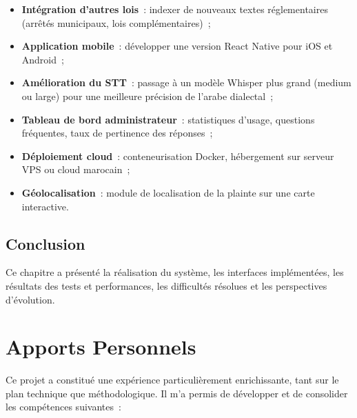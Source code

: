 \documentclass[12pt,a4paper]{report}
\begin{document}
\begin{itemize}[label=\textbullet]
    \item \textbf{Intégration d'autres lois}~: indexer de nouveaux textes réglementaires (arrêtés municipaux, lois complémentaires)~;
    \item \textbf{Application mobile}~: développer une version React Native pour iOS et Android~;
    \item \textbf{Amélioration du STT}~: passage à un modèle Whisper plus grand (medium ou large) pour une meilleure précision de l'arabe dialectal~;
    \item \textbf{Tableau de bord administrateur}~: statistiques d'usage, questions fréquentes, taux de pertinence des réponses~;
    \item \textbf{Déploiement cloud}~: conteneurisation Docker, hébergement sur serveur VPS ou cloud marocain~;
    \item \textbf{Géolocalisation}~: module de localisation de la plainte sur une carte interactive.
\end{itemize}

\section{Conclusion}

Ce chapitre a présenté la réalisation du système, les interfaces implémentées, les résultats des tests et performances, les difficultés résolues et les perspectives d'évolution.

\chapter*{Apports Personnels}

Ce projet a constitué une expérience particulièrement enrichissante, tant sur le plan technique que méthodologique. Il m'a permis de développer et de consolider les compétences suivantes~:
\end{document}
